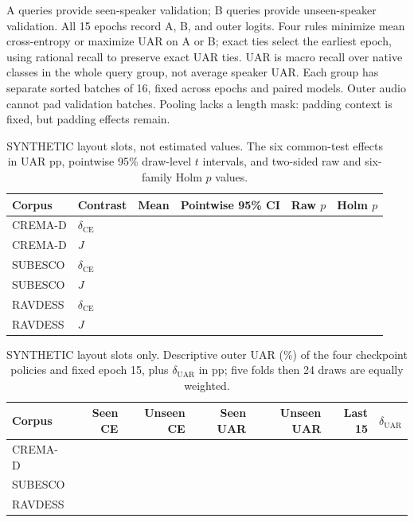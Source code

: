 \documentclass[letterpaper]{article}
\newcommand{\slot}{\makebox[36pt]{---}}
\newcommand{\cislot}{\makebox[88pt]{[---, ---]}}
\begin{document}
A queries provide seen-speaker validation; B queries provide unseen-speaker
validation. All 15 epochs record A, B, and outer logits. Four rules minimize
mean cross-entropy or maximize UAR on A or B; exact ties select the earliest
epoch, using rational recall to preserve exact UAR ties.
UAR is macro recall over native classes in the whole query group,
not average speaker UAR. Each group has separate sorted batches of 16,
fixed across epochs and paired models. Outer audio cannot pad validation
batches. Pooling lacks a length mask: padding context is fixed, but padding
effects remain.

\begin{table}[t]
\centering\small
\caption{SYNTHETIC layout slots, not estimated values. The six common-test effects in UAR pp, pointwise 95\% draw-level $t$ intervals, and two-sided raw and six-family Holm $p$ values.}
\label{tab:primary}
\setlength{\tabcolsep}{5pt}
\begin{tabular}{llrrrr}\toprule
Corpus & Contrast & Mean & Pointwise 95\% CI & Raw $p$ & Holm $p$\\\midrule
CREMA-D & $\delta_{\mathrm{CE}}$ & \slot & \cislot & \slot & \slot\\
CREMA-D & $J$ & \slot & \cislot & \slot & \slot\\
SUBESCO & $\delta_{\mathrm{CE}}$ & \slot & \cislot & \slot & \slot\\
SUBESCO & $J$ & \slot & \cislot & \slot & \slot\\
RAVDESS & $\delta_{\mathrm{CE}}$ & \slot & \cislot & \slot & \slot\\
RAVDESS & $J$ & \slot & \cislot & \slot & \slot\\\bottomrule
\end{tabular}
\end{table}

\begin{table}[t]
\centering\small
\caption{SYNTHETIC layout slots only. Descriptive outer UAR (\%) of the four checkpoint policies and fixed epoch 15, plus $\delta_{\mathrm{UAR}}$ in pp; five folds then 24 draws are equally weighted.}
\label{tab:absolute}
\setlength{\tabcolsep}{5pt}
\begin{tabular}{lrrrrrr}\toprule
Corpus & Seen CE & Unseen CE & Seen UAR & Unseen UAR & Last 15 & $\delta_{\mathrm{UAR}}$\\\midrule
CREMA-D & \slot & \slot & \slot & \slot & \slot & \slot\\
SUBESCO & \slot & \slot & \slot & \slot & \slot & \slot\\
RAVDESS & \slot & \slot & \slot & \slot & \slot & \slot\\\bottomrule
\end{tabular}
\end{table}
\end{document}
